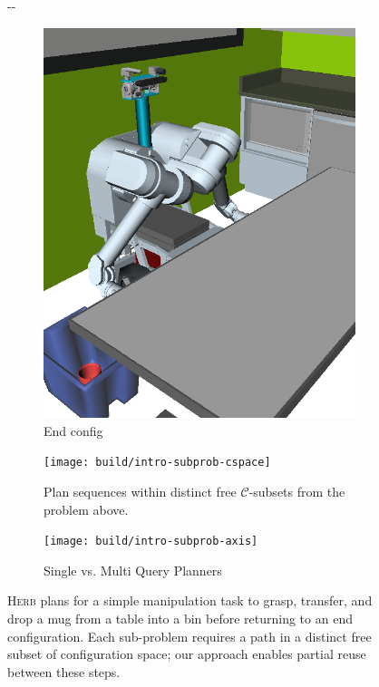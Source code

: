 \documentclass{report}
\newlength{\offsetpage}
\newenvironment{widepage}
   {\begin{adjustwidth}{-\offsetpage}{-\offsetpage}%
    \addtolength{\textwidth}{2\offsetpage}}%
{\end{adjustwidth}}
\begin{document}
{\begin{figure}
\begin{widepage}
\begin{center}
\begin{subfigure}[t]{0.19\linewidth}
\includegraphics[width=\columnwidth]{figs/testherb-e.png}
\caption{End config}
\end{subfigure}

\vspace{0.1in}

   \begin{subfigure}[b]{4.0in}
      \begin{center}
      \texttt{[image: build/intro-subprob-cspace]}
      \end{center}
      \caption{Plan sequences
         within distinct free $\mathcal{C}$-subsets
         from the problem above.}
   \end{subfigure}%
   \quad%
   \begin{subfigure}[b]{2.0in}
      \begin{center}
      \texttt{[image: build/intro-subprob-axis]}
      \end{center}
      \caption{Single vs. Multi Query Planners}
   \end{subfigure}
   \caption{\textsc{Herb} plans for a simple manipulation task
      to grasp, transfer, and drop a mug from a table into a bin
      before returning to an end configuration.
      Each sub-problem requires a path in a distinct free subset of
      configuration space;
      our approach enables partial reuse between these steps.}
   \label{fig:intro-multi-step}
\end{center}
\end{widepage}
\end{figure}
}
\end{document}
